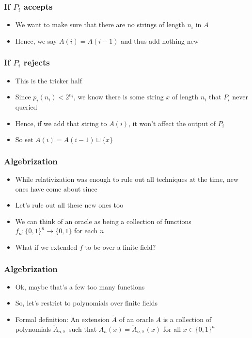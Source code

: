 \documentclass[xcolor={usenames,dvipsnames}]{beamer}
\begin{document}
\begin{frame}
  \frametitle{If $P_{i}$ accepts}
  \begin{itemize}
    \item We want to make sure that there are no strings of length $n_{i}$ in
          $A$
    \item Hence, we say $A(i) = A(i-1)$ and thus add nothing new
  \end{itemize}
\end{frame}

\begin{frame}
  \frametitle{If $P_{i}$ rejects}
  \begin{itemize}
    \item This is the tricker half
    \item Since $p_{i}(n_{i}) < 2^{n_{i}}$, we know there is some string $x$ of
          length $n_{i}$ that $P_{i}$ never queried
    \item Hence, if we add that string to $A(i)$, it won't affect the output of
          $P_{i}$
    \item So set $A(i) = A(i - 1) \sqcup \{x\}$
  \end{itemize}
\end{frame}

\begin{frame}
  \frametitle{Algebrization}
  \begin{itemize}
    \item While relativization was enough to rule out all techniques at the
          time, new ones have come about since
    \item Let's rule out all these new ones too
    \item We can think of an oracle as being a collection of functions
          $f_{n}: \{0, 1\}^{n} \rightarrow \{0, 1\}$ for each $n$
    \item What if we extended $f$ to be over a finite field?
  \end{itemize}
\end{frame}

\begin{frame}
  \frametitle{Algebrization}
  \begin{itemize}
    \item Ok, maybe that's a few too many functions
    \item So, let's restrict to polynomials over finite fields
    \item Formal definition: An extension $\tilde{A}$ of an oracle $A$ is a
          collection of polynomials $\tilde{A}_{n,\mathbb{F}}$ such that
          $A_{n}(x) = \tilde{A}_{n,\mathbb{F}}(x)$ for all $x \in \{0, 1\}^{n}$
  \end{itemize}
\end{frame}
\end{document}
